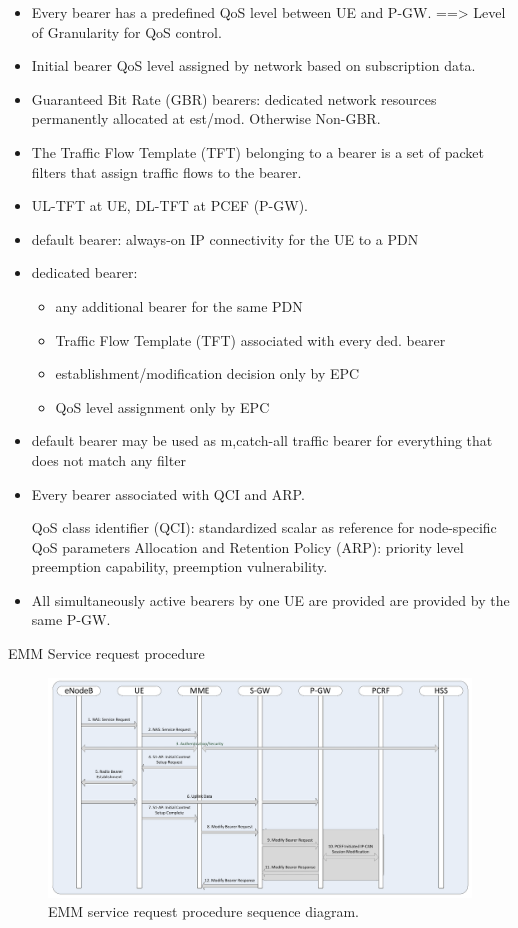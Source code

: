 \begin{itemize}
\item 	Every bearer has a predefined QoS level between UE and P-GW.
		==> Level of Granularity for QoS control.
\item	Initial bearer QoS level assigned by network based on subscription data.
\item	Guaranteed Bit Rate (GBR) bearers: dedicated network resources permanently allocated at est/mod. Otherwise Non-GBR.
\item	The Traffic Flow Template (TFT) belonging to a bearer is a set of packet filters that assign traffic flows to the bearer.
\item	UL-TFT at UE, DL-TFT at PCEF (P-GW).
\item 	default bearer: always-on IP connectivity for the UE to a PDN
\item	dedicated bearer:   
			\begin{itemize}
				\item any additional bearer for the same PDN
				\item Traffic Flow Template (TFT) associated with every ded. bearer
				\item establishment/modification decision only by EPC
				\item QoS level assignment only by EPC
			\end{itemize}

\item	default bearer may be used as {m,c}atch-all traffic bearer for everything that does not match any filter
\item	Every bearer associated with QCI and ARP.

QoS class identifier (QCI): standardized scalar as reference for node-specific QoS parameters
Allocation and Retention Policy (ARP): priority level preemption capability, preemption vulnerability.

\item	All simultaneously active bearers by one UE are provided are provided by the same P-GW.
\end{itemize}

EMM Service request procedure

\begin{figure}[htbp]
	\centering
	\includegraphics[width=1.2\textwidth]{images/UE-service-request.pdf}
	\caption{EMM service request procedure sequence diagram.}
	\label{c4:fig:3gpp-ueservicereq}
\end{figure}

